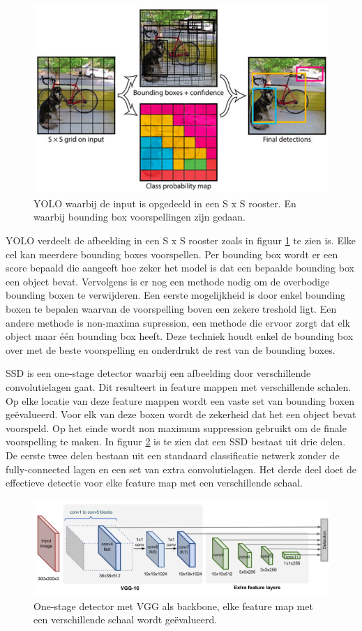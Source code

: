 \begin{figure}[!ht]
	\centering
	\includegraphics[width=0.60\linewidth]{fig/YOLO.jpg}
	\caption{YOLO waarbij de input is opgedeeld in een S x S rooster. 
	En waarbij bounding box voorspellingen zijn gedaan.}
	\label{fig:yolo}
\end{figure}

YOLO \cite{redmon_you_2016} verdeelt de afbeelding in een S x S rooster zoals in figuur \ref{fig:yolo} te zien is. 
Elke cel kan meerdere bounding boxes voorspellen.
Per bounding box wordt er een score bepaald die aangeeft hoe zeker het model is dat een bepaalde bounding box een object bevat.
Vervolgens is er nog een methode nodig om de overbodige bounding boxen te verwijderen. 
Een eerste mogelijkheid is door enkel bounding boxen te bepalen waarvan de voorspelling boven een zekere treshold ligt. 
Een andere methode is non-maxima supression, een methode die ervoor zorgt dat elk object maar \'e\'en bounding box heeft. 
Deze techniek houdt enkel de bounding box over met de beste voorspelling en onderdrukt de rest van de bounding boxes. 

SSD \cite{liu_ssd_2016} is een one-stage detector waarbij een afbeelding door verschillende convolutielagen gaat.
Dit resulteert in feature mappen met verschillende schalen.
Op elke locatie van deze feature mappen wordt een vaste set van bounding boxen ge\"evalueerd.
Voor elk van deze boxen wordt de zekerheid dat het een object bevat voorspeld.
Op het einde wordt non maximum suppression gebruikt om de finale voorspelling te maken.
In figuur \ref{fig:ssd} is te zien dat een SSD bestaat uit drie delen.
De eerste twee delen bestaan uit een standaard classificatie netwerk zonder de fully-connected lagen en een set van extra convolutielagen.
Het derde deel doet de effectieve detectie voor elke feature map met een verschillende schaal. 

\begin{figure}[!ht]
	\centering
	\includegraphics[width=0.80\linewidth]{fig/SSD.png}
	\caption{One-stage detector met VGG als backbone, elke feature map met een verschillende schaal wordt ge\"evalueerd.}
	\label{fig:ssd}
\end{figure}
